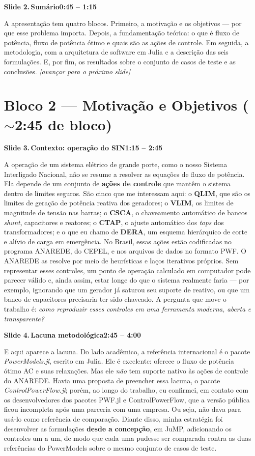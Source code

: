 \documentclass[11pt,a4paper]{article}
\newcommand{\slide}[3]{%
  \bigskip
  \noindent\colorbox{chipbg}{\parbox{\dimexpr\linewidth-2\fboxsep\relax}{%
    \textbf{\textcolor{ufcblue}{#1}}\,\textbf{#2}\hfill\textbf{\textcolor{ufcblue}{#3}}}}\par
  \nopagebreak\medskip
}
\newcommand{\cue}[1]{{\color{cue}\itshape[#1]}}
\begin{document}
\slide{Slide 2.}{Sumário}{0:45 -- 1:15}
A apresentação tem quatro blocos. Primeiro, a motivação e os objetivos --- por que esse problema importa. Depois, a fundamentação teórica: o que é fluxo de potência, fluxo de potência ótimo e quais são as ações de controle. Em seguida, a metodologia, com a arquitetura de software em Julia e a descrição das seis formulações. E, por fim, os resultados sobre o conjunto de casos de teste e as conclusões. \cue{avançar para o próximo slide}

\section*{\textcolor{ufcblue}{Bloco 2 --- Motivação e Objetivos ($\sim$2:45 de bloco)}}

\slide{Slide 3.}{Contexto: operação do SIN}{1:15 -- 2:45}
A operação de um sistema elétrico de grande porte, como o nosso Sistema Interligado Nacional, não se resume a resolver as equações de fluxo de potência. Ela depende de um conjunto de \textbf{ações de controle} que mantêm o sistema dentro de limites seguros. São cinco que me interessam aqui: o \textbf{QLIM}, que são os limites de geração de potência reativa dos geradores; o \textbf{VLIM}, os limites de magnitude de tensão nas barras; o \textbf{CSCA}, o chaveamento automático de bancos \textit{shunt}, capacitores e reatores; o \textbf{CTAP}, o ajuste automático dos \textit{taps} dos transformadores; e o que eu chamo de \textbf{DERA}, um esquema hierárquico de corte e alívio de carga em emergência. No Brasil, essas ações estão codificadas no programa ANAREDE, do CEPEL, e nos arquivos de dados no formato PWF. O ANAREDE as resolve por meio de heurísticas e laços iterativos próprios. Sem representar esses controles, um ponto de operação calculado em computador pode parecer válido e, ainda assim, estar longe do que o sistema realmente faria --- por exemplo, ignorando que um gerador já saturou seu suporte de reativo, ou que um banco de capacitores precisaria ter sido chaveado. A pergunta que move o trabalho é: \emph{como reproduzir esses controles em uma ferramenta moderna, aberta e transparente?}

\slide{Slide 4.}{Lacuna metodológica}{2:45 -- 4:00}
E aqui aparece a lacuna. Do lado acadêmico, a referência internacional é o pacote \textit{PowerModels.jl}, escrito em Julia. Ele é excelente: oferece o fluxo de potência ótimo AC e suas relaxações. Mas ele \emph{não} tem suporte nativo às ações de controle do ANAREDE. Havia uma proposta de preencher essa lacuna, o pacote \textit{ControlPowerFlow.jl}; porém, ao longo do trabalho, eu confirmei, em contato com os desenvolvedores dos pacotes PWF.jl e ControlPowerFlow, que a versão pública ficou incompleta após uma parceria com uma empresa. Ou seja, não dava para usá-lo como referência de comparação. Diante disso, minha estratégia foi desenvolver as formulações \textbf{desde a concepção}, em JuMP, adicionando os controles um a um, de modo que cada uma pudesse ser comparada contra as duas referências do PowerModels sobre o mesmo conjunto de casos de teste.
\end{document}

